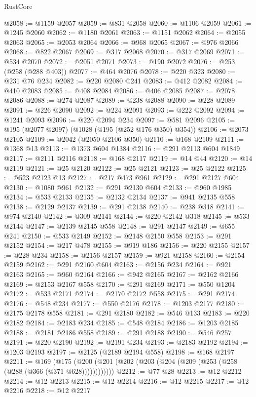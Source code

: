 \begin{lexlean}{RustCore}
\begin{coremodule}
@2058 := @1159 @2057
@2059 := @831 @2058
@2060 := @1106 @2059
@2061 := @1245 @2060
@2062 := @1180 @2061
@2063 := @1151 @2062
@2064 := @2055 @2063
@2065 := @2053 @2064
@2066 := @968 @2065
@2067 := @976 @2066
@2068 := @822 @2067
@2069 := @317 @2068
@2070 := @317 @2069
@2071 := @534 @2070
@2072 := @2051 @2071
@2073 := @190 @2072
@2076 := @253 (@258 (@288 @403))
@2077 := @464 @2076
@2078 := @220 @323
@2080 := @231 @76 @234
@2082 := @220 @2080 @241
@2083 := @412 @2082
@2084 := @410 @2083
@2085 := @408 @2084
@2086 := @406 @2085
@2087 := @2078 @2086
@2088 := @274 @2087
@2089 := @238 @2088
@2090 := @228 @2089
@2091 := @226 @2090
@2092 := @224 @2091
@2093 := @222 @2092
@2094 := @1241 @2093
@2096 := @220 @2094 @234
@2097 := @581 @2096
@2105 := @195 (@2077 @2097) (@1028 (@195 (@252 @176 @350) @354))
@2106 := @2073 @2105
@2109 := @2042 (@2050 @2106 @350)
@2110 := @168 @2109
@2111 := @1368 @13
@2113 := @1373 @604 @1384
@2116 := @291 @2113 @604 @1849
@2117 := @2111 @2116
@2118 := @168 @2117
@2119 := @14 @44
@2120 := @14 @2119
@2121 := @25 @2120
@2122 := @25 @2121
@2123 := @25 @2122
@2125 := @523 @2123 @13
@2127 := @217 @473 @961
@2129 := @291 @2127 @604
@2130 := @1080 @961
@2132 := @291 @2130 @604
@2133 := @960 @1985
@2134 := @533 @2133
@2135 := @2132 @2134
@2137 := @941 @2135 @558
@2138 := @2129 @2137
@2139 := @291 @2138
@2140 := @238 @318
@2141 := @974 @2140
@2142 := @309 @2141
@2144 := @220 @2142 @318
@2145 := @533 @2144
@2147 := @2139 @2145 @558
@2148 := @291 @2147
@2149 := @655 @241
@2150 := @533 @2149
@2152 := @2148 @2150 @558
@2153 := @291 @2152
@2154 := @217 @478
@2155 := @919 @186
@2156 := @220 @2155
@2157 := @228 @234
@2158 := @2156 @2157
@2159 := @921 @2158
@2160 := @2154 @2159
@2162 := @291 @2160 @604
@2163 := @2156 @234
@2164 := @921 @2163
@2165 := @960 @2164
@2166 := @942 @2165
@2167 := @2162 @2166
@2169 := @2153 @2167 @558
@2170 := @291 @2169
@2171 := @550 @1204
@2172 := @533 @2171
@2174 := @2170 @2172 @558
@2175 := @291 @2174
@2176 := @548 @234
@2177 := @550 @2176
@2178 := @1203 @2177
@2180 := @2175 @2178 @558
@2181 := @291 @2180
@2182 := @546 @133
@2183 := @220 @2182
@2184 := @2183 @234
@2185 := @548 @2184
@2186 := @1203 @2185
@2188 := @2181 @2186 @558
@2189 := @291 @2188
@2190 := @546 @257
@2191 := @220 @2190
@2192 := @2191 @234
@2193 := @2183 @2192
@2194 := @1203 @2193
@2197 := @2125 (@2189 @2194 @558)
@2198 := @168 @2197
@2211 := @169
    (@175 (@200 (@201 (@202 (@203 (@204 (@209 (@253 (@258 (@288 (@366 (@371 @628))))))))))))
@2212 := @77 @28
@2213 := @12 @2212
@2214 := @12 @2213
@2215 := @12 @2214
@2216 := @12 @2215
@2217 := @12 @2216
@2218 := @12 @2217

\end{coremodule}
\end{lexlean}
